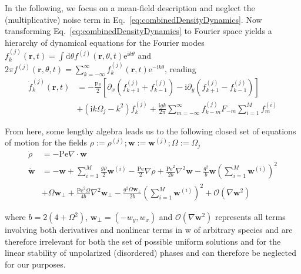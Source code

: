 \documentclass{article}
\begin{document}
In the following, we focus on a mean-field description and neglect the (multiplicative) noise term in Eq.~\eqref{eq:combinedDensityDynamics}. 
Now transforming Eq.~\eqref{eq:combinedDensityDynamics} to Fourier space yields a hierarchy of dynamical equations for the Fourier modes
$
f_k^{(j)}(\mathbf{r}, t)=\int\mathrm{d}\theta f^{(j)}(\mathbf{r},\theta,t)\mathrm{e}^{\mathrm{i}k\theta}
$
and
$
2\pi f^{(j)}(\mathbf{r},\theta ,t)=\sum_{k=-\infty}^{\infty}{f_{k}^{(j)}}(\mathbf{r},t)\mathrm{e}^{-\mathrm{i}k\theta}
$,
reading
\begin{equation}
    \begin{aligned}
        \dot{f}_k^{(j)}(\mathbf{r},t)&=-\frac{\mathrm{Pe}}{2}\left[\partial_x\left(f_{k+1}^{(j)}+f_{k-1}^{(j)}\right)-\mathrm{i}\partial_y\left(f_{k+1}^{(j)}-f_{k-1}^{(j)}\right)\right]\\
        &+ \left(\mathrm{i}k\Omega_j-k^2\right)f_k^{(j)}+\frac{\mathrm{i}gk}{2\pi}\sum_{m=-\infty}^\infty f_{k-m}^{(j)}F_{-m}\sum_{i=1}^Mf_m^{(i)}
    \end{aligned}
\end{equation}

From here, some lengthy algebra leads us to the following closed set of equations of motion for the fields $\rho:=\rho^{(j)};\mathbf{w}:=\mathbf{w}^{(j)};\Omega:=\Omega_j$
\begin{equation}
    \label{eq:hydrodynamicEq}
    \begin{aligned}
        \dot{\rho} &= -\mathrm{Pe}\nabla\cdot\mathbf{w}\\
        \dot{\mathbf{w}} &= -\mathbf{w}+\sum_{i=1}^M\frac{g\rho}2\mathbf{w}^{(i)}-\frac{\mathrm{Pe}}2\nabla\rho+\frac{\mathrm{Pe}^2}{2b}\nabla^2\mathbf{w}-\frac{g^2}b\mathbf{w}\left(\sum_{i=1}^M\mathbf{w}^{(i)}\right)^2\\
        &+ \Omega\mathbf{w}_\perp+\frac{\mathrm{Pe}^2\Omega}{4b}\nabla^2\mathbf{w}_\perp-\frac{g^2\Omega\mathbf{w}_\perp}{2b}\left(\sum_{i=1}^M\mathbf{w}^{(i)}\right)^2+\mathcal{O}\left(\nabla\mathbf{w}^2\right)
    \end{aligned}
\end{equation}

where $b=2\left( 4+\Omega ^2 \right)$, $\mathbf{w}_{\bot}=\left( -w_y,w_x \right)$ and $\mathcal{O}\left(\nabla\mathbf{w}^2\right)$ represents all terms involving both derivatives and nonlinear terms in w of arbitrary species and are therefore irrelevant for both the set of possible uniform solutions and for the linear stability of unpolarized (disordered) phases and can therefore be neglected for our purposes.
\end{document}
